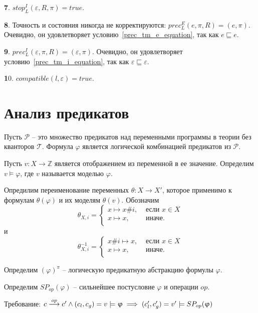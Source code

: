 {\textbf 7.} $stop^I_L(\varepsilon, R, \pi) = true$. 

{\textbf 8.} Точность и состояния никогда не корректируются: $prec^E_L(e, \pi, R) = (e, \pi)$.
Очевидно, он удовлетворяет условию~\ref{prec_tm_e_equation}, так как $e \sqsubseteq e$.

{\textbf 9.} $prec^I_L(\varepsilon, \pi, R) = (\varepsilon, \pi)$.
Очевидно, он удовлетворяет условию~\ref{prec_tm_i_equation}, так как $\varepsilon \sqsubseteq \varepsilon$.

{\textbf 10.} $compatible(l,\varepsilon) = true$.


\section{Анализ предикатов}
\label{sect_predicate_analysis}
Пусть $\mathscr{P}$ -- это множество предикатов над переменными программы в теории без кванторов $\mathscr{T}$.
Формула $\varphi$ является логической комбинацией предикатов из $\mathscr{P}$.

Пусть $v: X \to \mathbb{Z}$ является отображением из переменной в ее значение.
Определим $v \models \varphi$, где $v$ называется моделью $\varphi$.

Опредилим переименование переменных $\theta: X \to X'$, которое применимо к формулам $\theta(\varphi)$ и их моделям $\theta(v)$.
Обозначим
$$\theta_{X,i}= 
\left\lbrace\begin{array}{ll}
x \mapsto x\#i, & \mbox{ если } x \in X\\
x \mapsto x, &\mbox{ иначе}.\\
\end{array}
\right.
$$
и
$$\theta_{X,i}^{-1}= 
\left\lbrace\begin{array}{ll}
x\#i \mapsto x, & \mbox{ если } x \in X\\
x \mapsto x, &\mbox{ иначе}.\\
\end{array}
\right.
$$

Определим $(\varphi)^\pi$ -- логическую предикатную абстракцию формулы $\varphi$.

Определим $SP_{op}(\varphi)$ -- сильнейшее постусловие $\varphi$ и операции $op$.

Требование: $c \stackrel{op}{\longrightarrow} c' \land (c_l, c_g) = v \models \upvarphi \implies (c_l', c_g') = v' \models SP_{op}(\upvarphi)$

